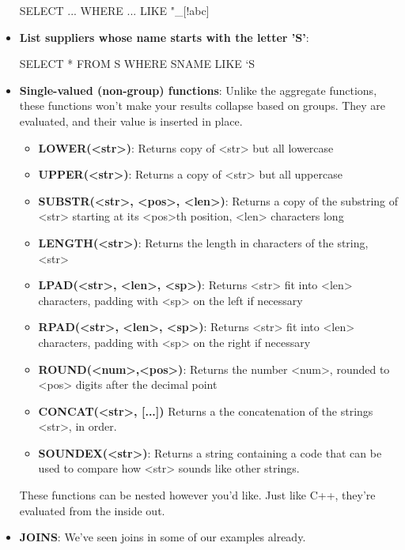 \documentclass{report}
\begin{document}
\begin{itemize}
\begin{sqlcode}
            SELECT ...
                WHERE ... LIKE "_[!abc]%
            \end{sqlcode}
        \item \textbf{List suppliers whose name starts with the letter 'S'}:
            \bigbreak \noindent 
            \begin{sqlcode}
                SELECT * FROM S
                    WHERE SNAME LIKE `S%
            \end{sqlcode}
        \item \textbf{Single-valued (non-group) functions}: Unlike the aggregate functions, these functions won't make your results collapse based on groups. They are evaluated, and their value is inserted in place.
            \begin{itemize}
                \item \textbf{LOWER(<str>)}: Returns copy of <str> but all lowercase
                \item \textbf{UPPER(<str>)}: Returns a copy of <str> but all uppercase
                \item \textbf{SUBSTR(<str>, <pos>, <len>)}: Returns a copy of the substring of <str> starting at its <pos>th position, <len> characters long
                \item \textbf{LENGTH(<str>)}: Returns the length in characters of the string, <str>
                \item \textbf{LPAD(<str>, <len>, <sp>)}: Returns <str> fit into <len> characters, padding with <sp> on the left if necessary
                \item \textbf{RPAD(<str>, <len>, <sp>)}: Returns <str> fit into <len> characters, padding with <sp> on the right if necessary
                \item \textbf{ROUND(<num>,<pos>)}: Returns the number <num>, rounded to <pos> digits after the decimal point
                \item \textbf{CONCAT(<str>, [...])} Returns a the concatenation of the strings <str>, in order.
                \item \textbf{SOUNDEX(<str>)}: Returns a string containing a code that can be used to compare how <str> sounds like other strings.
            \end{itemize}
            \bigbreak \noindent 
            These functions can be nested however you'd like. Just like C++, they're evaluated from the inside out.
        \item \textbf{JOINS}: We've seen joins in some of our examples already.

\end{itemize}
\end{document}
